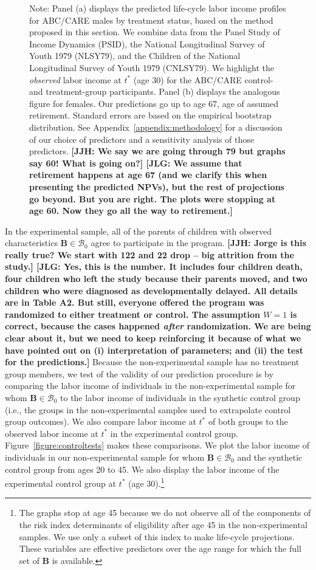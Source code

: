 \begin{figure}
Note: Panel (a) displays the predicted life-cycle labor income profiles for ABC/CARE males by treatment status, based on the method proposed in this section. We combine data from the Panel Study of Income Dynamics (PSID), the National Longitudinal Survey of Youth 1979 (NLSY79), and the Children of the National Longitudinal Survey of Youth 1979 (CNLSY79). We highlight the \textit{observed} labor income at $t^*$ (age 30) for the ABC/CARE control- and treatment-group participants. Panel (b) displays the analogous figure for females. Our predictions go up to age 67, age of assumed retirement. Standard errors are based on the empirical bootstrap distribution. See Appendix~\ref{appendix:methodology} for a discussion of our choice of predictors and a sensitivity analysis of those predictors. \textbf{[JJH: We say we are going through 79 but graphs say 60! What is going on?]
[JLG: We assume that retirement happens at age 67 (and we clarify this when presenting the predicted NPVs), but the rest of projections go beyond. But you are right. The plots were stopping at age 60. Now they go all the way to retirement.]}
\end{figure}

In the experimental sample, all of the parents of children with observed characteristics $\bm{B} \in \mathcal{B}_0$ agree to participate in the program. \textbf{[JJH: Jorge is this really true? We start with 122 and 22 drop -- big attrition from the study.] [JLG: Yes, this is the number. It includes four children death, four children who left the study because their parents moved, and two children who were diagnosed as developmentally delayed. All details are in Table A2. But still, everyone offered the program was randomized to either treatment or control. The assumption $W = 1$ is correct, because the cases happened \textit{after} randomization. We are being clear about it, but we need to keep reinforcing it because of what we have pointed out on (i) interpretation of parameters; and (ii) the test for the predictions.]} Because the non-experimental sample has no treatment group members, we test of the validity of our prediction procedure is by comparing the labor income of individuals in the non-experimental sample for whom $\bm{B} \in \mathcal{B}_0$ to the labor income of individuals in the synthetic control group (i.e., the groups in the non-experimental samples used to extrapolate control group outcomes). We also compare labor income at $t^*$ of both groups to the observed labor income at $t^*$ in the experimental control group. Figure~\ref{figure:controltests} makes these comparisons. We plot the labor income of individuals in our non-experimental sample for whom $\bm{B} \in \mathcal{B}_0$ and the synthetic control group from ages 20 to 45. We also display the labor income of the experimental control group at $t^*$ (age 30).\footnote{The graphs stop at age 45 because we do not observe all of the components of the risk index determinants of eligibility after age 45 in the non-experimental samples. We use only a subset of this index to make life-cycle projections. These variables are effective predictors over the age range for which the full set of $\bm{B}$ is available.}

